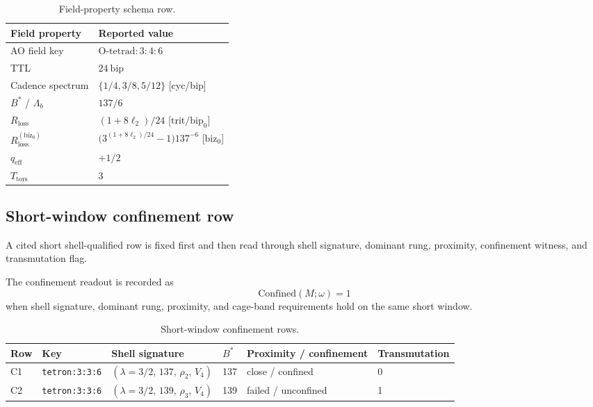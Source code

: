 \begin{table}[H]
\centering
\caption{Field-property schema row.}
\label{tab:manual-field-property}
\begin{threeparttable}
\small
\begin{tabular}{@{}ll@{}}
\toprule
Field property & Reported value \\
\midrule
AO field key & $\mathrm{O\text{-}tetrad{:}3{:}4{:}6}$ \\
TTL & $24\ \mathrm{bip}$ \\
Cadence spectrum & $\{1/4,3/8,5/12\}$ [cyc/bip] \\
$B^*$ / $\Lambda_b$ & $137 / 6$ \\
$R_{\mathrm{loss}}$ & $(1+8\ell_2)/24$ [\(\mathrm{trit}/\mathrm{bip}_0\)] \\
$R_{\mathrm{loss}}^{(\mathrm{biz}_0)}$ & $\bigl(3^{(1+8\ell_2)/24}-1\bigr)137^{-6}$ [\(\mathrm{biz}_0\)] \\
$q_{\mathrm{eff}}$ & $+1/2$ \\
$T_{\mathrm{tors}}$ & $3$ \\
\bottomrule
\end{tabular}
\end{threeparttable}
\end{table}

\subsection{Short-window confinement row}
\label{man:short-window-confinement-row}
A cited short shell-qualified row is fixed first and then read through shell signature, dominant rung, proximity, confinement witness, and transmutation flag.\par\smallskip
{}

The confinement readout is recorded as
\[
\mathrm{Confined}(M;\omega)=1
\]
when shell signature, dominant rung, proximity, and cage-band requirements hold on the same short window.

\begin{table}[H]
\centering
\caption{Short-window confinement rows.}
\label{tab:manual-short-window-confinement}
\begin{threeparttable}
\small
\begin{tabular}{@{}llllll@{}}
\toprule
Row & Key & Shell signature & $B^*$ & Proximity / confinement & Transmutation \\
\midrule
C1 & \texttt{tetron:3:3:6} & $(\lambda\!=\!3/2,\,137,\,\rho_2,\,V_4)$ & 137 & close / confined & 0 \\
C2 & \texttt{tetron:3:3:6} & $(\lambda\!=\!3/2,\,139,\,\rho_3,\,V_4)$ & 139 & failed / unconfined & 1 \\
\bottomrule
\end{tabular}
\end{threeparttable}
\end{table}

